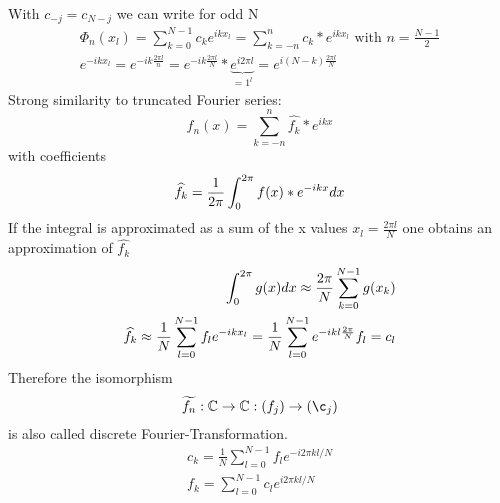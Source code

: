 \begin{remark}
    With $c_{-j} = c_{N-j}$ we can write for odd N
    \begin{align*}
        \Phi_n(x_l) = \sum_{k=0}^{N-1} c_k e^{ikx_l} = \sum_{k = -n}^{n} c_k *e^{ikx_l}  
        \text{ with } n = \frac{N-1}{2}\\
        e^{-ikx_l} = e^{-ik \frac{2 \pi l}{n}} = e^{-i k \frac{2 \pi l}{N}} * \underbrace{e^{i 2 \pi l}}_{=1^l}
        = e^{i (N-k) \frac{2 \pi l}{N}}
    \end{align*}
    Strong similarity to truncated Fourier series:
    \begin{equation*}
        f_n(x) = \sum_{k = -n}^{n} \widehat{f_k} * e^{ikx}
    \end{equation*}
    with coefficients
    \begin{equation*}
        \widehat{f_k} = \frac{1}{2 \pi } \int_{0}^{2 \pi} f(x) * e^{-ikx} dx
    \end{equation*}
    If the integral is approximated as a sum of the x values $x_l = \frac{2 \pi l}{N}$ one
    obtains an approximation of $\widehat{f_k}$
    \begin{align*}
        \int_{0}^{2 \pi} g(x) dx \approx \frac{2 \pi }{N} \sum_{k = 0}^{N-1}g(x_k)\\
        \widehat{f_k} \approx \frac{1}{N} \sum_{l = 0}^{N-1} f_l e^{-ikx_l} = \frac{1}{N}
        \sum_{l=0}^{N-1} e^{-ikl \frac{2 \pi}{N}} f_l = c_l
    \end{align*}
    Therefore the isomorphism
    \begin{equation*}
        \widetilde{f_n}: \mathbb{C} \to \mathbb{C}: (f_j) \to (\c_j)
    \end{equation*}
    is also called discrete Fourier-Transformation.
    \begin{align*}
        c_k = \frac{1}{N} \sum_{l=0}^{N-1} f_l e^{-i 2 \pi k l / N}\\
        f_k = \sum_{l=0}^{N-1} c_l e^{i 2 \pi k l / N}
    \end{align*}
\end{remark}

